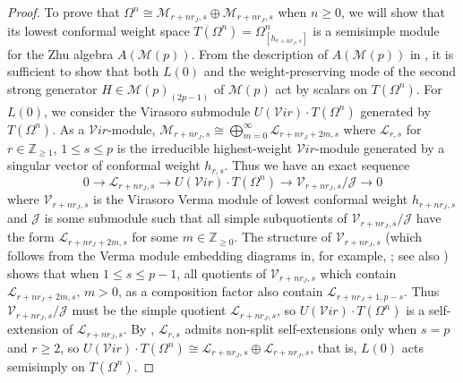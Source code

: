 \documentclass[11pt, reqno]{amsart}
\theoremstyle{definition}\newtheorem{defi}[thm]{Definition}
\theoremstyle{definition}\newtheorem{rem}[thm]{Remark}
\theoremstyle{definition}\newtheorem{exam}[thm]{Example}
\theoremstyle{definition}\newtheorem{assum}[thm]{Assumption}
\newcommand{\cV}{\mathcal{V}}
\newcommand{\cM}{\mathcal{M}}
\newcommand{\cJ}{\mathcal{J}}
\newcommand{\cL}{\mathcal{L}}
\newcommand{\ZZ}{\mathbb{Z}}
\begin{document}
\begin{proof}
To prove that $\Omega^n\cong\cM_{r+nr_J,s}\oplus\cM_{r+nr_J,s}$ when $n\geq 0$, we will show that its lowest conformal weight space $T(\Omega^n)=\Omega^n_{[h_{r+nr_J,s}]}$ is a semisimple module for the Zhu algebra $A(\cM(p))$. From the description of $A(\cM(p))$ in \cite{Ad}, it is sufficient to show that both $L(0)$ and the weight-preserving mode of the second strong generator $H\in\cM(p)_{(2p-1)}$ of $\cM(p)$ act by scalars on $T(\Omega^n)$. For $L(0)$, we consider the Virasoro submodule $U(\cV ir)\cdot T(\Omega^n)$ generated by $T(\Omega^n)$. As a $\cV ir$-module, $\cM_{r+nr_J,s}\cong
\bigoplus_{m=0}^\infty \cL_{r+nr_J+2m,s}$
 where $\cL_{r,s}$ for $r\in\ZZ_{\geq 1}$, $1\leq s\leq p$ is the irreducible highest-weight $\cV ir$-module generated by a singular vector of conformal weight $h_{r,s}$. Thus we have an exact sequence
\begin{equation*}
0\longrightarrow \cL_{r+nr_J,s}\longrightarrow U(\cV ir)\cdot T(\Omega^n)\longrightarrow \cV_{r+nr_J,s}/\cJ \longrightarrow 0
\end{equation*}
where $\cV_{r+nr_J,s}$ is the Virasoro Verma module of lowest conformal weight $h_{r+nr_J,s}$ and $\cJ$ is some submodule such that all simple subquotients of $\cV_{r+nr_J,s}/\cJ$ have the form $\cL_{r+nr_J+2m,s}$ for some $m\in\ZZ_{\geq 0}$. The structure of $\cV_{r+nr_J,s}$ (which follows from the Verma module embedding diagrams in, for example, \cite[Section 5.3]{IK}; see also \cite[Section 2.1]{MY}) shows that when $1\leq s\leq p-1$, all quotients of $\cV_{r+nr_J,s}$ which contain $\cL_{r+nr_J+2m,s}$, $m>0$, as a composition factor also contain $\cL_{r+nr_J+1,p-s}$. Thus $\cV_{r+nr_J,s}/\cJ$ must be the simple quotient $\cL_{r+nr_J,s}$, so $U(\cV ir)\cdot T(\Omega^n)$ is a self-extension of $\cL_{r+nr_J,s}$. By \cite[Section 5.4]{GK}, $\cL_{r,s}$ admits non-split self-extensions only when $s=p$ and $r\geq 2$, so $U(\cV ir)\cdot T(\Omega^n)\cong\cL_{r+nr_J,s}\oplus \cL_{r+nr_J,s}$, that is, $L(0)$ acts semisimply on $T(\Omega^n)$.


\end{proof}
\end{document}
